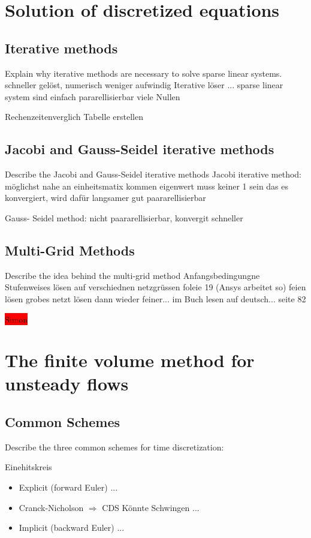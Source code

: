 \documentclass[a4paper]{scrartcl}
\begin{document}
\section{Solution of discretized equations}


\subsection{Iterative methods} 
Explain why iterative methods are necessary to
solve sparse linear systems.
schneller gelöst, numerisch weniger aufwindig
Iterative löser ...
sparse linear system sind einfach pararellisierbar viele Nullen

Rechenzeitenverglich Tabelle erstellen

\subsection{Jacobi and Gauss-Seidel iterative methods}
Describe the Jacobi and Gauss-Seidel iterative methods
Jacobi iterative method: 
möglichst nahe an einheitsmatix kommen
eigenwert muss keiner 1 sein das es konvergiert, wird dafür langsamer 
gut paararellisierbar

Gauss- Seidel method: 
nicht paararellisierbar, konvergit schneller

\subsection{Multi-Grid Methods} 
Describe the idea behind the multi-grid method
Anfangsbedingungne 
Stufenweises lösen auf verschiednen netzgrüssen
foleie 19 (Ansys arbeitet so)
feien lösen
grobes netzt lösen
dann wieder feiner...
im Buch lesen auf deutsch... seite 82

\colorbox{red}{Simon}

\section{The finite volume method for unsteady flows}
\subsection{Common Schemes} Describe the three common schemes for time
discretization:

Einehitskreis 
\begin{itemize}
\item Explicit (forward Euler)
...

\item Cranck-Nicholson $\Rightarrow$ CDS
Könnte Schwingen
...

\item Implicit (backward Euler)
...

\end{itemize}
\end{document}
